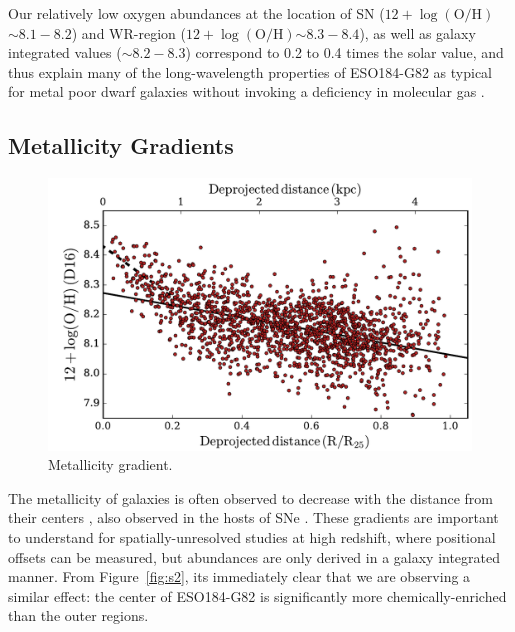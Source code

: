 \documentclass[traditabstract]{aa}
\newcommand{\oh}{$12+\log(\mathrm{O/H})$}
\begin{document}

Our relatively low oxygen abundances at the location of SN (\oh$\sim8.1-8.2$) and WR-region (\oh$\sim8.3-8.4$), as well as galaxy integrated values ($\sim8.2-8.3$) correspond to 0.2 to 0.4 times the solar value, and thus explain many of the long-wavelength properties of ESO184-G82 as typical for metal poor dwarf galaxies without invoking a deficiency in molecular gas \citep{2016arXiv160901742M}.


\subsection{Metallicity Gradients}
\label{sec:metgrad}

\begin{figure}
\includegraphics[angle=0, width=0.99\columnwidth]{Figs/MUSE_SN1998bw_metgrad.pdf}
\caption{Metallicity gradient.}
\label{fig:metgrad}
\end{figure}

The metallicity of galaxies is often observed to decrease with the distance from their centers \citep[e.g.][]{1994ApJ...420...87Z, 2014A&A...563A..49S}, also observed in the hosts of SNe \citep{2016A&A...591A..48G}. These gradients are important to understand for spatially-unresolved studies at high redshift, where positional offsets can be measured, but abundances are only derived in a galaxy integrated manner. From Figure~\ref{fig:s2}, its immediately clear that we are observing a similar effect: the center of ESO184-G82 is significantly more chemically-enriched than the outer regions. 
\end{document}
